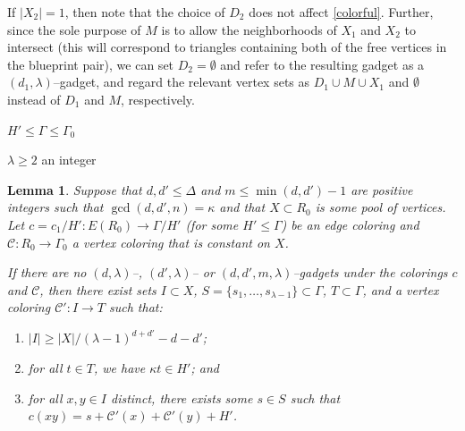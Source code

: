 \documentclass[10pt,a4paper]{amsart}
\newtheorem{lemma}{Lemma}
\newcommand{\cC}{\mathcal{C} }
\begin{document}
If $|X_2|=1$, then note that the choice of $D_2$ does not affect \cref{colorful}. Further, since the sole purpose of $M$ is to allow the neighborhoods of $X_1$ and $X_2$ to intersect (this will correspond to triangles containing both of the free vertices in the blueprint pair), we can set $D_2=\emptyset$ and refer to the resulting gadget as a $(d_1,\lambda)$--gadget, and regard the relevant vertex sets as $D_1\cup M\cup X_1$ and $\emptyset$ instead of $D_1$ and $M$, respectively.

$H'\leqslant \Gamma\leqslant\Gamma_0$

$\lambda\geq 2$ an integer

\begin{lemma}\label{core_phase_arg}
    Suppose that $d, d'\leq\Delta$ and $m\leq \min(d, d')-1$ are positive integers such that $\gcd(d, d', n)=\kappa$ and that   
    $X\subset R_0$ is some pool of vertices. Let $c=c_1/H':E(R_0)\to \Gamma/H'$ (for some $H'\leqslant \Gamma$) be an edge coloring and $\cC:R_0\to \Gamma_0$ a vertex coloring that is constant on $X$. 
    
    If there are no $(d,\lambda)$--, $(d',\lambda)$-- or $(d,d',m,\lambda)$--gadgets under the colorings $c$ and $\cC$, then there exist sets $I\subset X$, $S=\{s_1,\ldots,s_{\lambda-1}\}\subset \Gamma$, $T\subset \Gamma$, and a vertex coloring $\cC':I\to T$ such that: 
    \begin{enumerate}
        \item $|I|\geq |X|/(\lambda-1)^{d+d'} - d-d'$;
        \item for all $t\in T$, we have $\kappa t \in H'$; and
        \item for all $x,y\in I$ distinct, there exists some $s\in S$ such that $c(xy)=s+\cC'(x)+\cC'(y)+H'$.
    \end{enumerate}  
\end{lemma}
\end{document}
